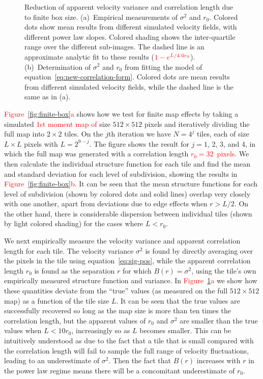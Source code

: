 \documentclass[fleqn,usenatbib, useAMS, a4paper]{mnras}
\begin{document}
\begin{figure}
\begin{tabular}{@{} l @{}}
  \end{tabular}
  \caption{
    Reduction of apparent velocity variance and correlation length
    due to finite box size.
    (a)~Empirical measurements of \(\sigma^2\) and \(r_0\).
    Colored dots show mean results from different simulated velocity fields,
    with different power law slopes.
    Colored shading shows the inter-quartile range over the different sub-images.
    The dashed line is an approximate analytic fit to these results
    (\(\color{red}1 - e^{L / 4.0r_0}\)).
    (b)~Determination of \(\sigma^2\) and \(r_0\) from fitting the model
    of equation~\eqref{eq:new-correlation-form}.
    Colored dots are mean results from different simulated velocity fields,
    while the dashed line is the same as in (a).
  }
  \label{fig:finite-box-effect}
\end{figure}

\textcolor{red}{Figure~\ref{fig:finite-box}a} shows how we test for finite map effects by taking
a simulated \textcolor{red}{1st moment map of} size \(512 \times 512\) pixels and iteratively
dividing the full map into \(2 \times 2\) tiles.
On the \(j\)th iteration we have \(N = 4^j\) tiles,
each of size \(L \times L \) pixels with \(L = 2^{9 - j}\).
The figure shows the result for \(j = 1\), 2, 3, and 4, in which the full map
was generated with a correlation length \textcolor{red}{\(r_0 = 32\)~pixels}.
We then calculate the individual structure function for each tile and
find the mean and standard deviation for each level of subdivision,
showing the results in \textcolor{red}{Figure~\ref{fig:finite-box}b}.
It can be seen that the mean structure functions for each level
of subdivision (shown by colored dots and solid lines)
overlap very closely with one another, apart from deviations
due to edge effects when \(r > L/2\).
On the other hand, there is considerable dispersion between
individual tiles (shown by light colored shading) for the cases
where \(L < r_0\).

We next empirically measure the velocity variance and
apparent correlation length for each tile.
The velocity variance \(\sigma^2\) is found by
directly averaging over the pixels in the tile using equation~\eqref{eq:sig-pos},
while the apparent correlation length \(r_0\)
is found as the separation \(r\) for which \(B(r) = \sigma^2\),
using the tile's own empirically measured structure function and variance.
In \textcolor{red}{Figure~\ref{fig:finite-box-effect}a} we show how these
quantities deviate from the ``true'' values
(as measured on the full \(512 \times 512\) map)
as a function of the tile size \(L\).
It can be seen that the true values are successfully recovered
so long as the map size is more than ten times the correlation length,
but the apparent values of \(r_0\) and \(\sigma^2\) are smaller than the true values
when \(L < 10 r_0\), increasingly so as \(L\) becomes smaller.
This can be intuitively understood as due to the fact that a tile that
is small compared with the correlation length will
fail to sample the full range of velocity fluctuations,
leading to an underestimate of \(\sigma^2\).
Then the fact that \(B(r)\) increases with \(r\) in the power law regime
means there will be a concomitant underestimate of \(r_0\).
\end{document}

